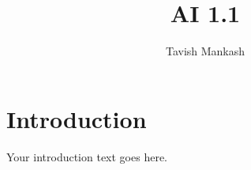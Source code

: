 \documentclass[12pt,a4paper]{article}
\title{AI 1.1}
\author{Tavish Mankash}
\date{}
\begin{document}
\maketitle

\section{Introduction}
Your introduction text goes here.


% 
% 
\end{document}
